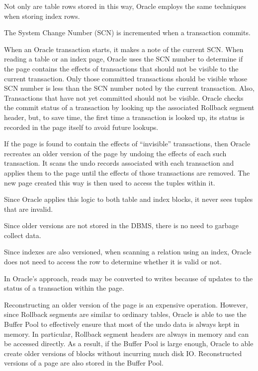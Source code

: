 \documentclass{article}
\begin{document}
Not only are table rows stored in this way, Oracle employs the same
techniques when storing index rows.

The System Change Number (SCN) is incremented when a transaction
commits.

When an Oracle transaction starts, it makes a note of the current
SCN. When reading a table or an index page, Oracle uses the SCN
number to determine if the page contains the effects of transactions
that should not be visible to the current transaction. Only those
committed transactions should be visible whose SCN number is less
than the SCN number noted by the current transaction. Also,
Transactions that have not yet committed should not be visible.
Oracle checks the commit status of a transaction by looking up the
associated Rollback segment header, but, to save time, the first
time a transaction is looked up, its status is recorded in the page
itself to avoid future lookups.

If the page is found to contain the effects of ``invisible''
transactions, then Oracle recreates an older version of the page by
undoing the effects of each such transaction. It scans the undo
records associated with each transaction and applies them to the
page until the effects of those transactions are removed. The new
page created this way is then used to access the tuples within it.

Since Oracle applies this logic to both table and index blocks, it
never sees tuples that are invalid.

Since older versions are not stored in the DBMS, there is no need to
garbage collect data.

Since indexes are also versioned, when scanning a relation using an
index, Oracle does not need to access the row to determine whether
it is valid or not.

In Oracle's approach, reads may be converted to writes because of
updates to the status of a transaction within the page.

Reconstructing an older version of the page is an expensive
operation. However, since Rollback segments are similar to ordinary
tables, Oracle is able to use the Buffer Pool to effectively ensure
that most of the undo data is always kept in memory. In particular,
Rollback segment headers are always in memory and can be accessed
directly. As a result, if the Buffer Pool is large enough, Oracle to
able create older versions of blocks without incurring much disk IO.
Reconstructed versions of a page are also stored in the Buffer Pool.
\end{document}
